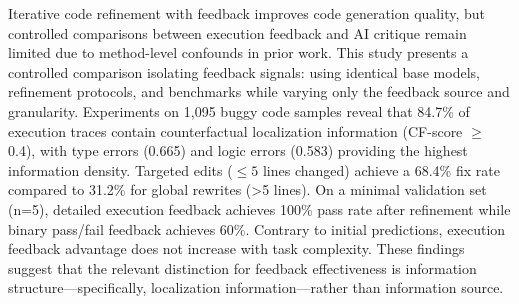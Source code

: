 
Iterative code refinement with feedback improves code generation quality, but controlled comparisons between execution feedback and AI critique remain limited due to method-level confounds in prior work. This study presents a controlled comparison isolating feedback signals: using identical base models, refinement protocols, and benchmarks while varying only the feedback source and granularity. Experiments on 1,095 buggy code samples reveal that 84.7\% of execution traces contain counterfactual localization information (CF-score $\geq$ 0.4), with type errors (0.665) and logic errors (0.583) providing the highest information density. Targeted edits ($\leq 5$ lines changed) achieve a 68.4\% fix rate compared to 31.2\% for global rewrites (>5 lines). On a minimal validation set (n=5), detailed execution feedback achieves 100\% pass rate after refinement while binary pass/fail feedback achieves 60\%. Contrary to initial predictions, execution feedback advantage does not increase with task complexity. These findings suggest that the relevant distinction for feedback effectiveness is information structure---specifically, localization information---rather than information source.
